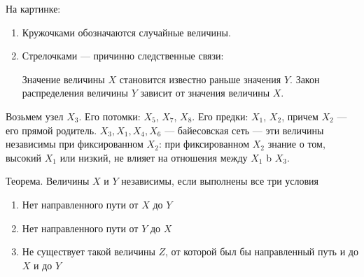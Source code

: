 
На картинке:
\begin{enumerate}
\item Кружочками обозначаются случайные величины.
\item Стрелочками --- причинно следственные связи:


Значение величины $X$ становится известно раньше значения $Y$. Закон распределения величины $Y$ зависит от значения величины $X$.
\end{enumerate}

Возьмем узел $X_3$. Его потомки: $X_5$, $X_7$, $X_8$.  Его предки: $X_1$, $X_2$, причем $X_2$ --- его прямой родитель. ${X_3, X_1, X_4, X_6}$ --- байесовская сеть --- эти величины независимы при фиксированном $X_2$: при фиксированном $X_2$ знание о том, высокий $X_1$ или низкий, не влияет на отношения между $X_1$  b $X_3$.


Теорема. Величины $X$ и $Y$ независимы, если выполнены все три условия 
\begin{enumerate}
\item Нет направленного пути от $X$ до $Y$
\item Нет направленного пути от $Y$ до $X$
\item Не существует такой величины $Z$, от которой был бы направленный путь и до $X$ и до $Y$
\end{enumerate}

